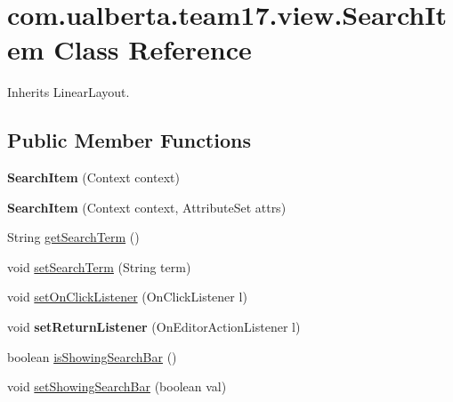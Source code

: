 \hypertarget{classcom_1_1ualberta_1_1team17_1_1view_1_1_search_item}{\section{com.\+ualberta.\+team17.\+view.\+Search\+Item Class Reference}
\label{classcom_1_1ualberta_1_1team17_1_1view_1_1_search_item}
}


Inherits Linear\+Layout.

\subsection*{Public Member Functions}
\begin{DoxyCompactItemize}
\item 
\hypertarget{classcom_1_1ualberta_1_1team17_1_1view_1_1_search_item_a31610767f6a6dd45847c119d2794d7ea}{{\bfseries Search\+Item} (Context context)}\label{classcom_1_1ualberta_1_1team17_1_1view_1_1_search_item_a31610767f6a6dd45847c119d2794d7ea}

\item 
\hypertarget{classcom_1_1ualberta_1_1team17_1_1view_1_1_search_item_abd5ca736d06073963f50f24b3ed24534}{{\bfseries Search\+Item} (Context context, Attribute\+Set attrs)}\label{classcom_1_1ualberta_1_1team17_1_1view_1_1_search_item_abd5ca736d06073963f50f24b3ed24534}

\item 
String \hyperlink{classcom_1_1ualberta_1_1team17_1_1view_1_1_search_item_a786dd33d0bf5cbfe1354dcea1decbb7c}{get\+Search\+Term} ()
\item 
void \hyperlink{classcom_1_1ualberta_1_1team17_1_1view_1_1_search_item_acc5ec5a8c1aac15d7ae72cd52915246e}{set\+Search\+Term} (String term)
\item 
void \hyperlink{classcom_1_1ualberta_1_1team17_1_1view_1_1_search_item_a1113f62c1f34134de8d9e7cedbecebde}{set\+On\+Click\+Listener} (On\+Click\+Listener l)
\item 
\hypertarget{classcom_1_1ualberta_1_1team17_1_1view_1_1_search_item_aa0fb06f1855be96a49994ecb35a8fbf7}{void {\bfseries set\+Return\+Listener} (On\+Editor\+Action\+Listener l)}\label{classcom_1_1ualberta_1_1team17_1_1view_1_1_search_item_aa0fb06f1855be96a49994ecb35a8fbf7}

\item 
boolean \hyperlink{classcom_1_1ualberta_1_1team17_1_1view_1_1_search_item_a62ee82095572655028a82b17c054267d}{is\+Showing\+Search\+Bar} ()
\item 
void \hyperlink{classcom_1_1ualberta_1_1team17_1_1view_1_1_search_item_ad9235784f46dc4853999cd03fee29216}{set\+Showing\+Search\+Bar} (boolean val)
\end{DoxyCompactItemize}


